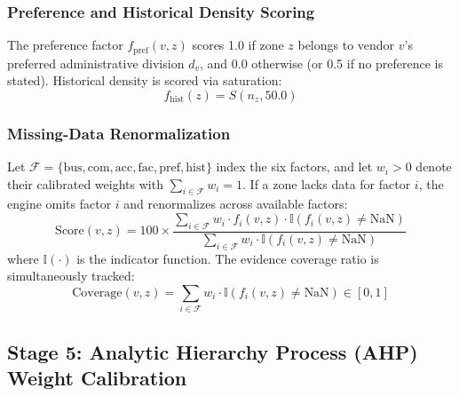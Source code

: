 \subsubsection{Preference and Historical Density Scoring}
The preference factor $f_{\text{pref}}(v, z)$ scores 1.0 if zone $z$ belongs to vendor $v$'s preferred administrative division $d_v$, and 0.0 otherwise (or 0.5 if no preference is stated). Historical density is scored via saturation:
\begin{equation}
    f_{\text{hist}}(z) = S(n_z, 50.0)
    \label{eq:f_hist}
\end{equation}

\subsubsection{Missing-Data Renormalization}
Let $\mathcal{F} = \{\text{bus}, \text{com}, \text{acc}, \text{fac}, \text{pref}, \text{hist}\}$ index the six factors, and let $w_i > 0$ denote their calibrated weights with $\sum_{i \in \mathcal{F}} w_i = 1$. If a zone lacks data for factor $i$, the engine omits factor $i$ and renormalizes across available factors:
\begin{equation}
    \text{Score}(v, z) = 100 \times \frac{\sum_{i \in \mathcal{F}} w_i \cdot f_i(v, z) \cdot \mathbb{I}(f_i(v, z) \ne \text{NaN})}{\sum_{i \in \mathcal{F}} w_i \cdot \mathbb{I}(f_i(v, z) \ne \text{NaN})}
    \label{eq:mcda_aggregation}
\end{equation}
where $\mathbb{I}(\cdot)$ is the indicator function. The evidence coverage ratio is simultaneously tracked:
\begin{equation}
    \text{Coverage}(v, z) = \sum_{i \in \mathcal{F}} w_i \cdot \mathbb{I}(f_i(v, z) \ne \text{NaN}) \in [0, 1]
    \label{eq:coverage}
\end{equation}

\subsection{Stage 5: Analytic Hierarchy Process (AHP) Weight Calibration}
\label{sec:meth_stage5}

